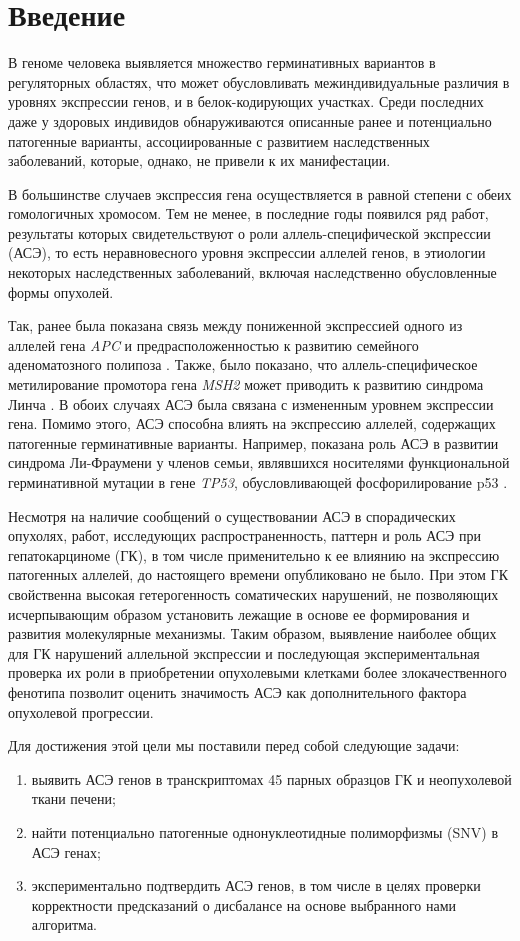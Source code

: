 \section{Введение}

В геноме человека выявляется множество герминативных вариантов в регуляторных областях, что может обусловливать межиндивидуальные различия в уровнях экспрессии генов, и в белок-кодирующих участках. Среди последних даже у здоровых индивидов обнаруживаются описанные ранее и потенциально патогенные варианты, ассоциированные с развитием наследственных заболеваний, которые, однако, не привели к их манифестации.

В большинстве случаев экспрессия гена осуществляется в равной степени с обеих гомологичных хромосом. Тем не менее, в последние годы появился ряд работ, результаты которых свидетельствуют о роли аллель-специфической экспрессии (АСЭ), то есть неравновесного уровня экспрессии аллелей генов, в этиологии некоторых наследственных заболеваний, включая наследственно обусловленные формы опухолей.

Так, ранее была показана связь между пониженной экспрессией одного из аллелей гена \textit{APC} и предрасположенностью к развитию семейного аденоматозного полипоза \cite{galiatsatos_familial_2006}. Также, было показано, что аллель-специфическое метилирование промотора гена \textit{MSH2} может приводить к развитию синдрома Линча \cite{chan_heritable_2006}. В обоих случаях АСЭ была связана с измененным уровнем экспрессии гена. Помимо этого, АСЭ способна влиять на экспрессию аллелей, содержащих патогенные герминативные варианты. Например, показана роль АСЭ в развитии синдрома Ли-Фраумени у членов семьи, являвшихся носителями функциональной герминативной мутации в гене \textit{TP53}, обусловливающей фосфорилирование p53 \cite{buzby_allele-specific_2017}.

Несмотря на наличие сообщений о существовании АСЭ в спорадических опухолях, работ, исследующих распространенность, паттерн и роль АСЭ при гепатокарциноме (ГК), в том числе применительно к ее влиянию на экспрессию патогенных аллелей, до настоящего времени опубликовано не было. При этом ГК свойственна высокая гетерогенность соматических нарушений, не позволяющих исчерпывающим образом установить лежащие в основе ее формирования и развития молекулярные механизмы. Таким образом, выявление наиболее общих для ГК нарушений аллельной экспрессии и последующая экспериментальная проверка их роли в приобретении опухолевыми клетками более злокачественного фенотипа позволит оценить значимость АСЭ как дополнительного фактора опухолевой прогрессии.

Для достижения этой цели мы поставили перед собой следующие задачи:
\begin{enumerate}
	\item выявить АСЭ генов в транскриптомах 45 парных образцов ГК и неопухолевой ткани печени;
	\item найти потенциально патогенные однонуклеотидные полиморфизмы (SNV) в АСЭ генах;
	\item экспериментально подтвердить АСЭ генов, в том числе в целях проверки корректности предсказаний о дисбалансе на основе выбранного нами алгоритма.
\end{enumerate}